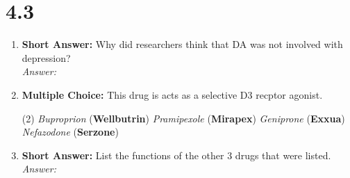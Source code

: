 \section*{4.3}
\begin{enumerate}[label = \textbf{Q4.3.\arabic*}]
    \item \textbf{Short Answer:} Why did researchers think that DA was not involved with depression? \\
          \textit{Answer:} \\ %

    \item \textbf{Multiple Choice:} This drug is acts as a selective D3 recptor agonist.
    \begin{tasks}[label=\textcolor{\documentTheme}{(\Alph*)}, item-format=\color{\documentTheme}, label-width=1.5em, item-indent=1.7em](2)
        \task \textit{Buproprion} (\textbf{Wellbutrin})
        \task \textit{Pramipexole} (\textbf{Mirapex})
        \task \textit{Geniprone} (\textbf{Exxua})
        \task \textit{Nefazodone} (\textbf{Serzone})
     \end{tasks}

     \item \textbf{Short Answer:} List the functions of the other 3 drugs that were listed.  \\
           \textit{Answer:} \\ %


\end{enumerate}
